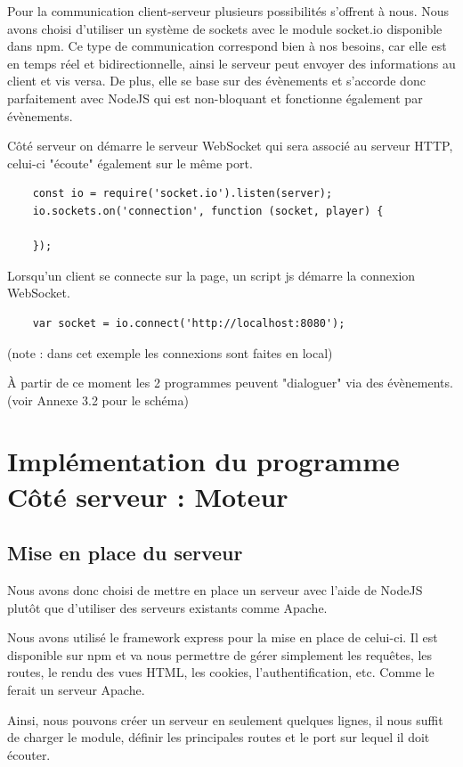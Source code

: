 \documentclass[12pt, openany]{report}
\begin{document}
Pour la communication client-serveur plusieurs possibilités s'offrent à nous.
Nous avons choisi d'utiliser un système de sockets avec le module socket.io disponible dans npm.
Ce type de communication correspond bien à nos besoins, car elle est en temps réel et bidirectionnelle, ainsi le serveur peut envoyer des informations au client et vis versa. De plus, elle se base sur des évènements et s'accorde donc parfaitement avec NodeJS qui est non-bloquant et fonctionne également par évènements.

Côté serveur on démarre le serveur WebSocket qui sera associé au serveur HTTP, celui-ci "écoute" également sur le même port.

\begin{verbatim}
    const io = require('socket.io').listen(server);
    io.sockets.on('connection', function (socket, player) {
        
    });
\end{verbatim}

Lorsqu'un client se connecte sur la page, un script js démarre la connexion WebSocket. 

\begin{verbatim}
    var socket = io.connect('http://localhost:8080');
\end{verbatim}
(note : dans cet exemple les connexions sont faites en local)

À partir de ce moment les 2 programmes peuvent "dialoguer" via des évènements.
(voir Annexe 3.2 pour le schéma)

\newpage
\section{Implémentation du programme Côté serveur : Moteur}

\subsection{Mise en place du serveur}

Nous avons donc choisi de mettre en place un serveur avec l'aide de NodeJS plutôt que d'utiliser des serveurs existants comme Apache.

Nous avons utilisé le framework express pour la mise en place de celui-ci. Il est disponible sur npm et va nous permettre de gérer simplement les requêtes, les routes, le rendu des vues HTML, les cookies, l'authentification, etc. Comme le ferait un serveur Apache.

Ainsi, nous pouvons créer un serveur en seulement quelques lignes, il nous suffit de charger le module, définir les principales routes et le port sur lequel il doit écouter.
\end{document}
